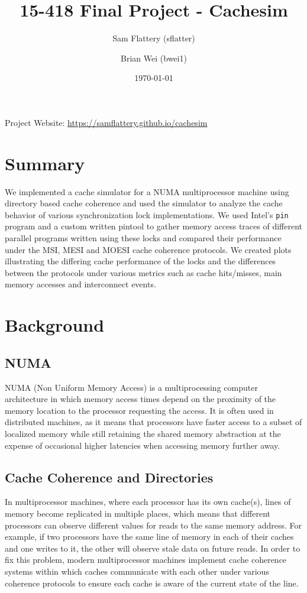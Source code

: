 \documentclass{article}
\title{15-418 Final Project - Cachesim}
\author{Sam Flattery (sflatter) \and Brian Wei (bwei1)}
\date{\today}
\begin{document}
\maketitle

Project Website: \href{https://samflattery.github.io/cachesim}{https://samflattery.github.io/cachesim}

\section{Summary}
We implemented a cache simulator for a NUMA multiprocessor machine using directory based cache coherence and used the simulator to analyze the cache behavior of various synchronization lock implementations. We used Intel's \texttt{pin} program and a custom written pintool to gather memory access traces of different parallel programs written using these locks and compared their performance under the MSI, MESI and MOESI cache coherence protocols.  We created plots illustrating the differing cache performance of the locks and the differences between the protocols under various metrics such as cache hits/misses, main memory accesses and interconnect events.

\section{Background}
\subsection{NUMA}
NUMA (Non Uniform Memory Access) is a multiprocessing computer architecture in which memory access times depend on the proximity of the memory location to the processor requesting the access.  It is often used in distributed machines, as it means that processors have faster access to a subset of localized memory while still retaining the shared memory abstraction at the expense of occasional higher latencies when accessing memory further away.

\subsection{Cache Coherence and Directories}
In multiprocessor machines, where each processor has its own cache(s), lines of memory become replicated in multiple places, which means that different processors can observe different values for reads to the same memory address.  For example, if two processors have the same line of memory in each of their caches and one writes to it, the other will observe stale data on future reads.  In order to fix this problem, modern multiprocessor machines implement cache coherence systems within which caches communicate with each other under various coherence protocols to ensure each cache is aware of the current state of the line.
\end{document}
